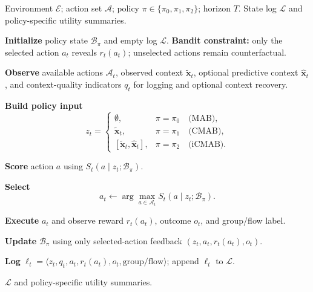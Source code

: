\documentclass[conference]{IEEEtran}
\begin{document}
\begin{algorithm}[!t]
\caption{Context-Spectrum Bandit Runner}
\label{alg:context_spectrum_runner}
\small
\begin{tcolorbox}[
  colback=gray!4,
  colframe=gray!35,
  boxrule=0.3pt,
  arc=2pt,
  left=3pt,
  right=3pt,
  top=3pt,
  bottom=3pt
]
\begin{algorithmic}
\Require Environment $\mathcal{E}$; action set $\mathcal{A}$; policy
$\pi \in \{\pi_0,\pi_1,\pi_2\}$; horizon $T$.
\Ensure State log $\mathcal{L}$ and policy-specific utility summaries.

\State \textbf{Initialize} policy state $\mathcal{B}_{\pi}$ and empty log
$\mathcal{L}$.
\State \textbf{Bandit constraint:} only the selected action $a_t$ reveals
$r_t(a_t)$; unselected actions remain counterfactual.

    \State \textbf{Observe} available actions $\mathcal{A}_t$, observed context
    $\tilde{\mathbf{x}}_t$, optional predictive context $\hat{\mathbf{x}}_t$,
    and context-quality indicators $q_t$ for logging and optional context
    recovery.

    \State \textbf{Build policy input}
    \[
    z_t =
    \begin{cases}
    \emptyset, & \pi=\pi_0 \quad \text{(MAB)},\\
    \tilde{\mathbf{x}}_t, & \pi=\pi_1 \quad \text{(CMAB)},\\
    [\tilde{\mathbf{x}}_t,\hat{\mathbf{x}}_t], & \pi=\pi_2 \quad \text{(iCMAB)}.
    \end{cases}
    \]

        \State \textbf{Score} action $a$ using
        $S_t(a\mid z_t;\mathcal{B}_{\pi})$.
    \EndFor

    \State \textbf{Select}
    \[
    a_t \leftarrow
    \arg\max_{a\in\mathcal{A}_t} S_t(a\mid z_t;\mathcal{B}_{\pi}).
    \]

    \State \textbf{Execute} $a_t$ and observe reward $r_t(a_t)$, outcome
    $o_t$, and group/flow label.

    \State \textbf{Update} $\mathcal{B}_{\pi}$ using only selected-action
    feedback $(z_t,a_t,r_t(a_t),o_t)$.

    \State \textbf{Log}
    $\ell_t=\langle z_t,q_t,a_t,r_t(a_t),o_t,\text{group/flow}\rangle$;
    append $\ell_t$ to $\mathcal{L}$.
\EndFor

\State \Return $\mathcal{L}$ and policy-specific utility summaries.
\end{algorithmic}
\end{tcolorbox}
\end{algorithm}
\end{document}
